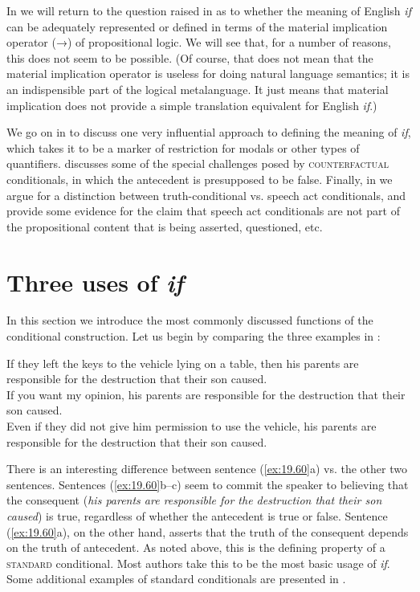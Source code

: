 In  we will return to the question raised in  as to whether the meaning of English \textit{if} can be adequately represented or defined in terms of the material implication operator (→) of propositional logic. We will see that, for a number of reasons, this does not seem to be possible. (Of course, that does not mean that the material implication operator is useless for doing natural language semantics; it is an indispensible part of the logical metalanguage. It just means that material implication does not provide a simple translation equivalent for English \textit{if}.)



We go on in  to discuss one very influential approach to defining the meaning of \textit{if}, which takes it to be a marker of restriction for modals or other types of quantifiers.  discusses some of the special challenges posed by \textsc{counterfactual} conditionals, in which the antecedent is presupposed to be false. Finally, in  we argue for a distinction between truth-conditional vs. speech act conditionals, and provide some evidence for the claim that speech act conditionals are not part of the propositional content that is being asserted, questioned, etc.


\section{Three uses of \textit{if}}\label{sec:19.2}

In this section we introduce the most commonly discussed functions of the conditional construction. Let us begin by comparing the three examples in :


\ea \label{ex:19.60}
\ea  If they left the keys to the vehicle lying on a table, then his parents are responsible for the destruction that their son caused.\\
\ex If you want my opinion, his parents are responsible for the destruction that their son caused.\\
\ex Even if they did not give him permission to use the vehicle, his parents are responsible for the destruction that their son caused.
                       \z
\z


There is an interesting difference between sentence (\ref{ex:19.60}a) vs. the other two sentences. Sentences (\ref{ex:19.60}b–c) seem to commit the speaker to believing that the consequent (\textit{his parents are responsible for the destruction that their son caused}) is true, regardless of whether the antecedent is true or false. Sentence (\ref{ex:19.60}a), on the other hand, asserts that the truth of the consequent depends on the truth of antecedent. As noted above, this is the defining property of a \textsc{standard} conditional. Most authors take this to be the most basic usage of \textit{if}. Some additional examples of standard conditionals are presented in . 


